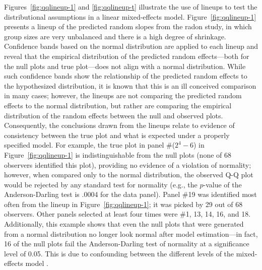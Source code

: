 \documentclass[12pt]{article}
\newcommand{\hh}[1]{{\color{orange} #1}}
\newcommand{\al}[1]{{\color{ForestGreen} #1}}
\begin{document}
Figures~\ref{fig:qqlineup-1} and \ref{fig:qqlineup-t} illustrate the use of lineups to test the distributional assumptions in a linear mixed-effects model. Figure~\ref{fig:qqlineup-1} presents a lineup of the predicted random slopes from the radon study, in which group sizes are very unbalanced and there is a high degree of shrinkage.
Confidence bands based on the normal distribution are applied to each lineup and reveal that the empirical distribution of the predicted random effects---both for the null plots and true plot---does not align with a normal distribution. While such confidence bands show the relationship of the predicted random effects to the hypothesized distribution, it is known that this is an ill conceived comparison in many cases; however, the lineups are not comparing the predicted random effects to the normal distribution, but rather are comparing the empirical distribution of the random effects between the null and observed plots. Consequently, the conclusions drawn from the lineups relate to evidence of consistency between the true plot and what is expected under a properly specified model. For example, the true plot in panel \#($2^4 - 6$) in Figure~\ref{fig:qqlineup-1}  is indistinguishable from the null plots (none of 68 observers identified this plot), providing no evidence of a violation of normality; however, when compared only to the normal distribution, the observed Q-Q plot would %
be rejected by any standard test for normality (e.g., the $p$-value of the Anderson-Darling test is .0004 for the data panel).
Panel \#19 was identified  most often from the lineup in Figure~\ref{fig:qqlineup-1}; it was picked by 29 out of 68 observers. Other panels  selected at least four times were \#1, 13, 14, 16, and 18. 
Additionally, this example shows that even the null plots that were generated from a normal distribution no longer look normal after  model estimation---in fact, 16 of the null plots fail the Anderson-Darling test of normality at a significance level of 0.05. This is due to confounding between the different levels of the mixed-effects model  \citep{adam}.
\end{document}
